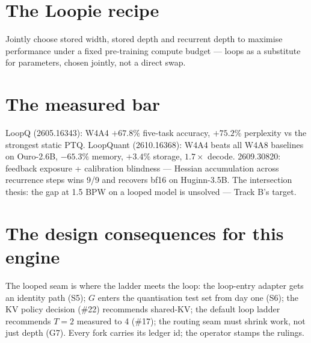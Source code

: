 \section{The Loopie recipe}

Jointly choose stored width, stored depth and recurrent depth to maximise performance under a
fixed pre-training compute budget --- loops as a substitute for parameters, chosen jointly, not
a direct swap.

\section{The measured bar}

LoopQ (2605.16343): W4A4 $+67.8\%$ five-task accuracy, $+75.2\%$ perplexity vs the strongest
static PTQ. LoopQuant (2610.16368): W4A4 beats all W4A8 baselines on Ouro-2.6B, $-65.3\%$
memory, $+3.4\%$ storage, $1.7\times$ decode. 2609.30820: feedback exposure + calibration
blindness --- Hessian accumulation across recurrence steps wins 9/9 and recovers bf16 on
Huginn-3.5B. The intersection thesis: the gap at 1.5 BPW on a looped model is unsolved ---
Track B's target.

\section{The design consequences for this engine}

The looped seam is where the ladder meets the loop: the loop-entry adapter gets an identity
path (S5); $G$ enters the quantisation test set from day one (S6); the KV policy decision
(\#22) recommends shared-KV; the default loop ladder recommends $T = 2$ measured to 4 (\#17);
the routing seam must shrink work, not just depth (G7). Every fork carries its ledger id; the
operator stamps the rulings.

